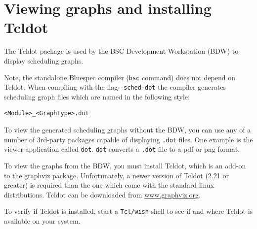 \documentclass{article}
\newcommand{\te}[1]{\texttt{#1}}
\begin{document}
\section{Viewing graphs and installing Tcldot}
\label{graphviz-install}


The Tcldot package is used by the BSC Development Workstation (BDW) to
display scheduling graphs.  

Note, the standalone Bluespec compiler (\te{bsc} command) does not depend
on Tcldot. When compiling with the flag \te{-sched-dot} the compiler
generates scheduling graph files which are
named in the following style: 

\begin{verbatim}
<Module>_<GraphType>.dot
\end{verbatim}

To view the generated scheduling graphs without the BDW, you 
can use any of a number of 3rd-party packages capable of displaying
\te{.dot} files. One example is  the
viewer application  called \te{dot}.  \te{dot} converts a \te{.dot}
file to a pdf or png format. 

To view the graphs from the BDW, you must
install Tcldot, which is an add-on to the graphviz package.
Unfortunately, a newer version of Tcldot (2.21 or greater) is required
than the one which come with the standard linux distributions.  Tcldot
can be downloaded from
\href{http://www.graphviz.org}{www.graphviz.org}.

To verify if Tcldot is installed, start a \te{Tcl/wish} shell to see
if and where Tcldot is available on your system.
\end{document}
